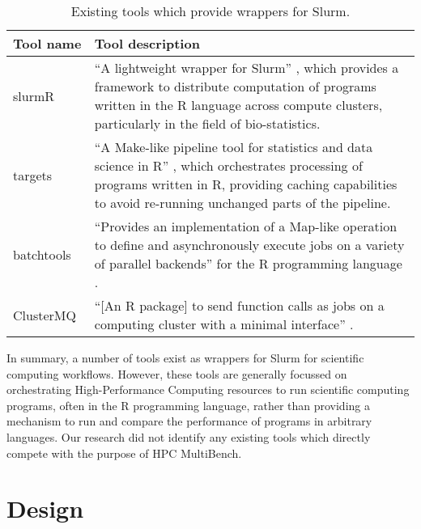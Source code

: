 \begin{table}[H]
    \caption{Existing tools which provide wrappers for Slurm.}
    \label{tab:hpc-multibench-existing-tools}
    \begin{tabular}{|p{0.2\linewidth}|p{0.8\linewidth}|}
    \hline
    \textbf{Tool name}  & \textbf{Tool description} \\ \hline\hline
    slurmR     & ``A lightweight wrapper for Slurm'' \cite{gvegayonJournalOpenSource}, which provides a framework to distribute computation of programs written in the R language across compute clusters, particularly in the field of bio-statistics. \\ \hline
    targets    & ``A Make-like pipeline tool for statistics and data science in R'' \cite{landauTargetsPackageDynamic2021}, which orchestrates processing of programs written in R, providing caching capabilities to avoid re-running unchanged parts of the pipeline. \\ \hline
    batchtools & ``Provides an implementation of a Map-like operation to define and asynchronously execute jobs on a variety of parallel backends'' for the R programming language \cite{langBatchtoolsToolsWork2017}. \\ \hline
    ClusterMQ  & ``[An R package] to send function calls as jobs on a computing cluster with a minimal interface'' \cite{schubertClustermqEnablesEfficient2019}. \\ \hline
    \end{tabular}
\end{table}

In summary, a number of tools exist as wrappers for Slurm for scientific computing workflows. However, these tools are generally focussed on orchestrating High-Performance Computing resources to run scientific computing programs, often in the R programming language, rather than providing a mechanism to run and compare the performance of programs in arbitrary languages. Our research did not identify any existing tools which directly compete with the purpose of HPC MultiBench.

\section{Design}
\label{sec:hpc-multibench-design} %



